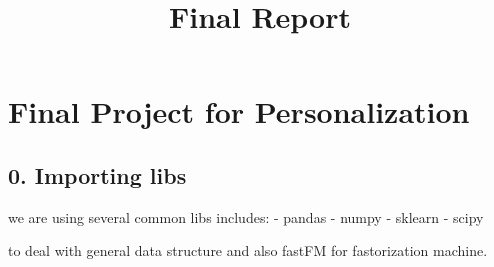\documentclass[11pt]{article}
\title{Final Report}
\begin{document}
    
    
    \maketitle
    
    

    
    \hypertarget{final-project-for-personalization}{%
\section{Final Project for
Personalization}\label{final-project-for-personalization}}

    \hypertarget{importing-libs}{%
\subsection{0. Importing libs}\label{importing-libs}}

we are using several common libs includes: - pandas - numpy - sklearn -
scipy

to deal with general data structure and also fastFM for fastorization
machine.
\end{document}

